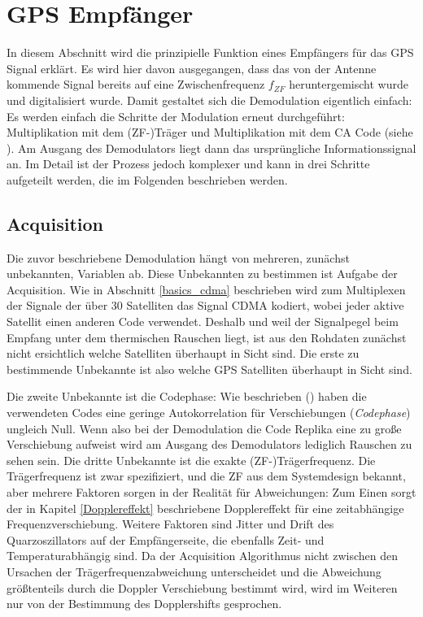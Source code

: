 \section{GPS Empfänger}
In diesem Abschnitt wird die prinzipielle Funktion eines Empfängers für das GPS Signal erklärt. Es wird hier davon ausgegangen, dass das von der Antenne kommende Signal bereits auf eine Zwischenfrequenz $f_{ZF}$ heruntergemischt wurde und digitalisiert wurde. Damit gestaltet sich die Demodulation eigentlich einfach: Es werden einfach die Schritte der Modulation erneut durchgeführt: Multiplikation mit dem (ZF-)Träger und Multiplikation mit dem CA Code (siehe ). Am Ausgang des Demodulators liegt dann das ursprüngliche Informationssignal an. Im Detail ist der Prozess jedoch komplexer und kann in drei Schritte aufgeteilt werden, die im Folgenden beschrieben werden.

\subsection{Acquisition}
Die zuvor beschriebene Demodulation hängt von mehreren, zunächst unbekannten, Variablen ab. Diese Unbekannten zu bestimmen ist Aufgabe der Acquisition.
Wie in Abschnitt \ref{basics_cdma} beschrieben wird zum Multiplexen der Signale der über 30 Satelliten das Signal CDMA kodiert, wobei jeder aktive Satellit einen anderen Code verwendet. Deshalb und weil der Signalpegel beim Empfang unter dem thermischen Rauschen liegt, ist aus den Rohdaten zunächst nicht ersichtlich welche Satelliten überhaupt in Sicht sind. Die erste zu bestimmende Unbekannte ist also welche GPS Satelliten überhaupt in Sicht sind.

Die zweite Unbekannte ist die \gls{Codephase}: Wie beschrieben () haben die verwendeten Codes eine geringe Autokorrelation für Verschiebungen (\emph{Codephase}) ungleich Null. Wenn also bei der Demodulation die Code Replika eine zu große Verschiebung aufweist wird am Ausgang des Demodulators lediglich Rauschen zu sehen sein.
Die dritte Unbekannte ist die exakte (ZF-)Trägerfrequenz. Die Trägerfrequenz ist zwar spezifiziert, und die ZF aus dem Systemdesign bekannt, aber mehrere Faktoren sorgen in der Realität für Abweichungen: Zum Einen sorgt der in Kapitel \ref{Dopplereffekt} beschriebene Dopplereffekt für eine zeitabhängige Frequenzverschiebung. Weitere Faktoren sind Jitter und Drift des Quarzoszillators auf der Empfängerseite, die ebenfalls Zeit- und Temperaturabhängig sind. Da der Acquisition Algorithmus nicht zwischen den Ursachen der Trägerfrequenzabweichung unterscheidet und die Abweichung größtenteils durch die Doppler Verschiebung bestimmt wird, wird im Weiteren nur von der Bestimmung des Dopplershifts gesprochen. 

